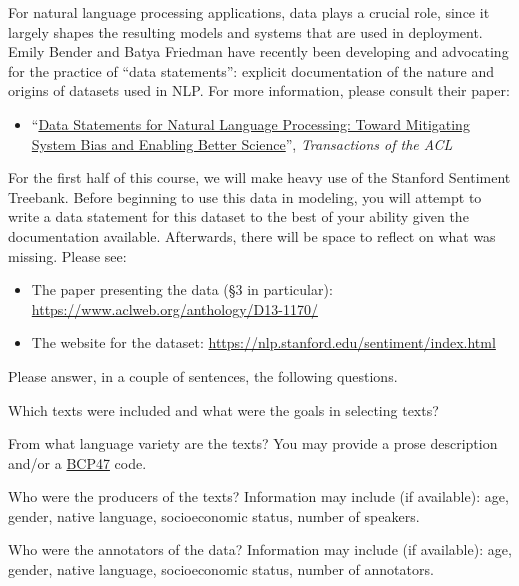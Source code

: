 \documentclass[11pt]{article}
\begin{document}
For natural language processing applications, data plays a crucial role, since it largely shapes the resulting models and systems that are used in deployment.  Emily Bender and Batya Friedman have recently been developing and advocating for the practice of ``data statements'': explicit documentation of the nature and origins of datasets used in NLP.  For more information, please consult their paper: 
\begin{itemize}
  \item ``\href{https://www.aclweb.org/anthology/Q18-1041/}{Data Statements for Natural Language Processing: Toward Mitigating System Bias and Enabling Better Science}'', \emph{Transactions of the ACL}
\end{itemize}
For the first half of this course, we will make heavy use of the Stanford Sentiment Treebank.  Before beginning to use this data in modeling, you will attempt to write a data statement for this dataset to the best of your ability given the documentation available.  Afterwards, there will be space to reflect on what was missing. Please see:
\begin{itemize}
  \item The paper presenting the data (\S3 in particular): \url{https://www.aclweb.org/anthology/D13-1170/}
  \item The website for the dataset: \url{https://nlp.stanford.edu/sentiment/index.html}
\end{itemize}
Please answer, in a couple of sentences, the following questions.

\vspace{2em}
 Which texts were included  and  what  were  the  goals  in  selecting texts?

\vspace{2em}
 From what language variety are the texts?  You may provide a prose description and/or a \href{https://tools.ietf.org/rfc/bcp/bcp47.txt}{BCP47} code.

\vspace{2em}
 Who were the producers of the texts?  Information may include (if available): age, gender, native language, socioeconomic status, number of speakers.

\vspace{2em}
 Who were the annotators of the data?  Information may include (if available): age, gender, native language, socioeconomic status, number of annotators.
\end{document}
